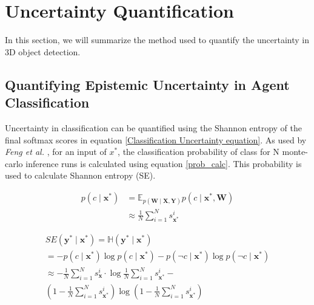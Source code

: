 \documentclass[10pt,twocolumn,letterpaper]{article}
\begin{document}
\section{Uncertainty Quantification}
In this section, we will summarize the method used to quantify the uncertainty in 3D object detection.
\subsection{Quantifying Epistemic Uncertainty in Agent Classification}
        \label{uncertainty in classification}
        Uncertainty in classification can be quantified using the Shannon entropy of the final softmax scores in equation \ref{Classification Uncertainty equation}. As used by \textit{Feng et al.} \cite{Feng2018}, for an input of $x^{*}$, the classification probability of class for N monte-carlo inference runs is calculated using equation \ref{prob_calc}. This probability is used to calculate Shannon entropy (SE).

        \begin{equation}
            \label{prob_calc}
            \begin{aligned}
                p\left(c \mid \mathbf{x}^{*}\right) &=\mathbb{E}_{p(\mathbf{W} \mid \mathbf{X}, \mathbf{Y})} p\left(c \mid \mathbf{x}^{*}, \mathbf{W}\right) \\
                & \approx \frac{1}{N} \sum_{i=1}^{N} s_{\mathbf{x}^{*}}^{i}
            \end{aligned}
        \end{equation}
        
        \begin{equation}
            \label{Classification Uncertainty equation}
            \begin{array}{l}
                S E\left(\mathbf{y}^{*} \mid \mathbf{x}^{*}\right)=\mathbb{H}\left(\mathbf{y}^{*} \mid \mathbf{x}^{*}\right) \\
                =-p\left(c \mid \mathbf{x}^{*}\right) \log p\left(c \mid \mathbf{x}^{*}\right)-p\left(\neg c \mid \mathbf{x}^{*}\right) \log p\left(\neg c \mid \mathbf{x}^{*}\right) \\
                \approx-\frac{1}{N} \sum_{i=1}^{N} s_{\mathbf{x}}^{i} \cdot \log \frac{1}{N} \sum_{i=1}^{N} s_{\mathbf{x}^{*}}^{i}- \\ \left(1-\frac{1}{N} \sum_{i=1}^{N} s_{\mathbf{x}^{*}}^{i}\right) \log \left(1-\frac{1}{N} \sum_{i=1}^{N} s_{\mathbf{x}^{*}}^{i}\right)
            \end{array}
        \end{equation}
        
\end{document}
